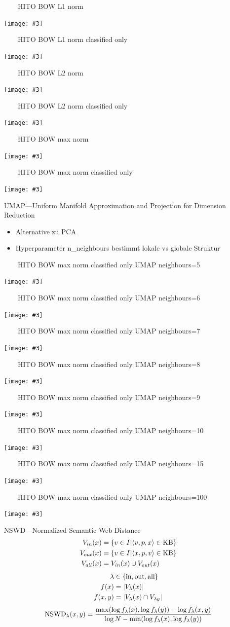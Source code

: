 \documentclass[aspectratio=1610,handout]{beamer}
\newcommand{\f}[1]{\ensuremath{f(#1)}}
\newcommand{\fl}[1]{\ensuremath{f_{\lambda}(#1)}}
\newcommand{\imageslide}[4][]
{
\begin{frame}[plain]{~~~~#2}
\vspace{0.2em}
\begin{center}
\centering\texttt{[image: \#3]}
\end{center}
#1
\note{#4}
\end{frame}
}
\begin{document}
\imageslide{HITO BOW L1 norm}{img/cluster-bagofwords-l1.pdf}{}
\imageslide{HITO BOW L1 norm classified only}{img/cluster-bagofwords-classifiedonly-l1.pdf}{}
\imageslide{HITO BOW L2 norm}{img/cluster-bagofwords-l2.pdf}{}
\imageslide{HITO BOW L2 norm classified only}{img/cluster-bagofwords-classifiedonly-l2.pdf}{}
\imageslide{HITO BOW max norm}{img/cluster-bagofwords-max.pdf}{}
\imageslide{HITO BOW max norm classified only}{img/cluster-bagofwords-classifiedonly-max.pdf}{}

\begin{frame}{UMAP---Uniform Manifold Approximation and Projection for Dimension Reduction}
\begin{itemize}
\item Alternative zu PCA
\item Hyperparameter n\_neighbours bestimmt lokale vs globale Struktur
\end{itemize}
\end{frame}

\imageslide{HITO BOW max norm classified only UMAP neighbours=5}{img/cluster-bagofwords-classifiedonly-umap-n5-max.pdf}{}
\imageslide{HITO BOW max norm classified only UMAP neighbours=6}{img/cluster-bagofwords-classifiedonly-umap-n6-max.pdf}{}
\imageslide{HITO BOW max norm classified only UMAP neighbours=7}{img/cluster-bagofwords-classifiedonly-umap-n7-max.pdf}{}
\imageslide{HITO BOW max norm classified only UMAP neighbours=8}{img/cluster-bagofwords-classifiedonly-umap-n8-max.pdf}{}
\imageslide{HITO BOW max norm classified only UMAP neighbours=9}{img/cluster-bagofwords-classifiedonly-umap-n9-max.pdf}{}
\imageslide{HITO BOW max norm classified only UMAP neighbours=10}{img/cluster-bagofwords-classifiedonly-umap-n10-max.pdf}{}
\imageslide{HITO BOW max norm classified only UMAP neighbours=15}{img/cluster-bagofwords-classifiedonly-umap-max.pdf}{}
\imageslide{HITO BOW max norm classified only UMAP neighbours=100}{img/cluster-bagofwords-classifiedonly-umap-n100-max.pdf}{}

\begin{frame}{NSWD---Normalized Semantic Web Distance~\cite{normalizedsemanticwebdistance}}
\begin{align*}
V_{in}(x)	&= \{v \in I| \langle v,p,x \rangle \in \textnormal{KB}\}\\
V_{out}(x)	&= \{v \in I| \langle x,p,v \rangle \in \textnormal{KB}\}\\
V_{all}(x)	&= V_{in}(x) \cup V_{out}(x)
\end{align*}
\begin{align*}
\lambda		&\in \{\textnormal{in}, \textnormal{out}, \textnormal{all}\}\\
\f{x}		&= |V_{\lambda}(x)|\\
\f{x,y}	&= |V_{\lambda}(x) \cap V_{\lambda{y}}|
\end{align*}
\[
\textnormal{NSWD}_{\lambda}(x,y) = \frac{\max(\log \fl{x}, \log \fl{y})- \log \fl{x,y}}{\log N - \min(\log \fl{x}, \log \fl{y})}
\]
\end{frame}
\end{document}
